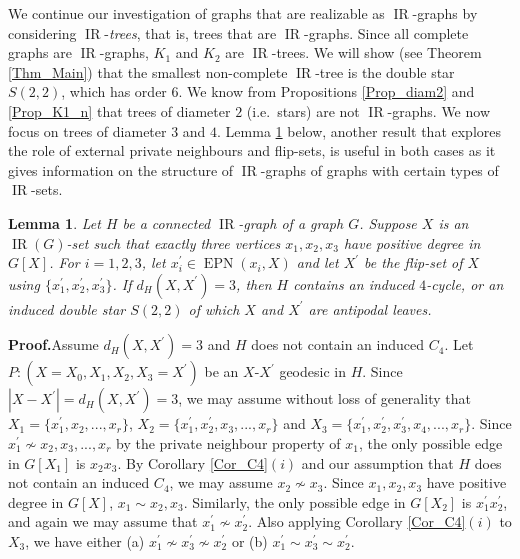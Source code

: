 \documentclass[12pt]{article}%
\newtheorem{lemma}[theorem]{Lemma}
\begin{document}
\label{Sec_Trees}We continue our investigation of graphs that are realizable
as $\operatorname{IR}$-graphs by considering $\operatorname{IR}$-\emph{trees},
that is, trees that are $\operatorname{IR}$-graphs. Since all complete graphs
are $\operatorname{IR}$-graphs, $K_{1}$ and $K_{2}$ are $\operatorname{IR}%
$-trees. We will show (see Theorem \ref{Thm_Main}) that the smallest
non-complete $\operatorname{IR}$-tree is the double star $S(2,2)$, which has
order $6$. We know from Propositions \ref{Prop_diam2} and \ref{Prop_K1_n} that
trees of diameter $2$ (i.e.~stars) are not $\operatorname{IR}$-graphs. We now
focus on trees of diameter $3$ and $4$. Lemma \ref{Lem_Not_Path} below,
another result that explores the role of external private neighbours and
flip-sets, is useful in both cases as it gives information on the structure of
$\operatorname{IR}$-graphs of graphs with certain types of $\operatorname{IR}$-sets.

\begin{lemma}
\label{Lem_Not_Path}Let $H$ be a connected $\operatorname{IR}$-graph of a
graph $G$. Suppose $X$ is an $\operatorname{IR}(G)$-set such that exactly
three vertices $x_{1},x_{2},x_{3}$ have positive degree in $G[X]$. For
$i=1,2,3$, let $x_{i}^{\prime}\in\operatorname{EPN}(x_{i},X)$ and let
$X^{\prime}$ be the flip-set of $X$ using $\{x_{1}^{\prime},x_{2}^{\prime
},x_{3}^{\prime}\}$. If $d_{H}(X,X^{\prime})=3$, then $H$ contains an induced
$4$-cycle, or an induced double star $S(2,2)$ of which $X$ and $X^{\prime}$
are antipodal leaves.
\end{lemma}

\noindent\textbf{Proof.}\hspace{0.1in}Assume $d_{H}(X,X^{\prime})=3$ and $H$
does not contain an induced $C_{4}$. Let $P:(X=X_{0},X_{1},X_{2}%
,X_{3}=X^{\prime})$ be an $X$-$X^{\prime}$ geodesic in $H$. Since
$|X-X^{\prime}|=d_{H}(X,X^{\prime})=3$, we may assume without loss of
generality that $X_{1}=\{x_{1}^{\prime},x_{2},...,x_{r}\}$, $X_{2}%
=\{x_{1}^{\prime},x_{2}^{\prime},x_{3},...,x_{r}\}$ and $X_{3}=\{x_{1}%
^{\prime},x_{2}^{\prime},x_{3}^{\prime},x_{4},...,x_{r}\}$. Since
$x_{1}^{\prime}\nsim x_{2},x_{3},...,x_{r}$ by the private neighbour property
of $x_{1}$, the only possible edge in $G[X_{1}]$ is $x_{2}x_{3}$. By Corollary
\ref{Cor_C4}$(i)$ and our assumption that $H$ does not contain an induced
$C_{4}$, we may assume $x_{2}\nsim x_{3}$. Since $x_{1},x_{2},x_{3}$ have
positive degree in $G[X]$, $x_{1}\sim x_{2},x_{3}$. Similarly, the only
possible edge in $G[X_{2}]$ is $x_{1}^{\prime}x_{2}^{\prime}$, and again we
may assume that $x_{1}^{\prime}\nsim x_{2}^{\prime}$. Also applying Corollary
\ref{Cor_C4}$(i)$ to $X_{3}$, we have either (a) $x_{1}^{\prime}\nsim
x_{3}^{\prime}\nsim x_{2}^{\prime}$ or (b) $x_{1}^{\prime}\sim x_{3}^{\prime
}\sim x_{2}^{\prime}$.
\end{document}
